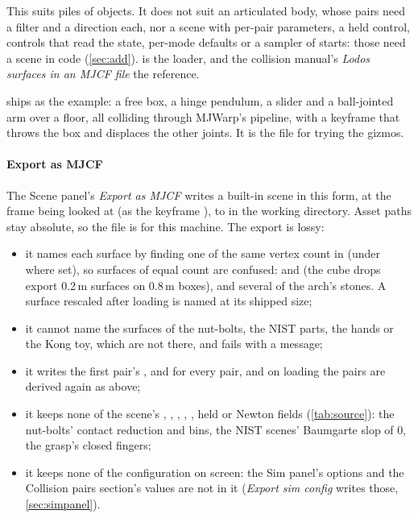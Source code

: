 This suits piles of objects. It does not suit an articulated body, whose pairs need a filter and a direction each, nor a scene with per-pair parameters, a held control, controls that read the state, per-mode defaults or a sampler of starts: those need a scene in code (\cref{sec:add}).  is the loader, and the collision manual's \emph{Lodos surfaces in an MJCF file} the reference.

 ships as the example: a free box, a hinge pendulum, a slider and a ball-jointed arm over a floor, all colliding through MJWarp's pipeline, with a keyframe  that throws the box and displaces the other joints. It is the file for trying the gizmos.

\paragraph{Export as MJCF} The Scene panel's \emph{Export as MJCF} writes a built-in scene in this form, at the frame being looked at (as the keyframe ), to  in the working directory. Asset paths stay absolute, so the file is for this machine. The export is lossy:

\begin{itemize}
\item it names each surface by finding one of the same vertex count in  (under  where set), so surfaces of equal count are confused:  and  (the cube drops export 0.2\,m surfaces on 0.8\,m boxes), and several of the arch's stones. A surface rescaled after loading is named at its shipped size;
\item it cannot name the surfaces of the nut-bolts, the NIST parts, the hands or the Kong toy, which are not there, and fails with a message;
\item it writes the first pair's ,  and  for every pair, and on loading the pairs are derived again as above;
\item it keeps none of the scene's , , , , , held  or Newton fields (\cref{tab:source}): the nut-bolts' contact reduction and bins, the NIST scenes' Baumgarte slop of 0, the grasp's closed fingers;
\item it keeps none of the configuration on screen: the Sim panel's options and the Collision pairs section's values are not in it (\emph{Export sim config} writes those, \cref{sec:simpanel}).
\end{itemize}

